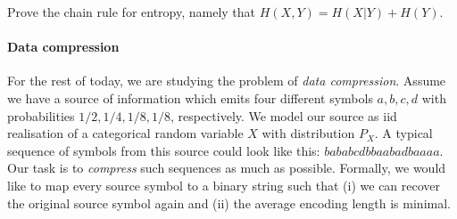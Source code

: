 \documentclass[10pt, a5paper]{scrartcl}
\begin{document}
\boardquestions


\begin{exercise}
	Prove the chain rule for entropy, namely that $H(X,Y)=H(X|Y)+H(Y)$.	
\end{exercise}


\paragraph{Data compression}
For the rest of today, we are studying the problem of \emph{data compression}. 
Assume we have a source of information which emits four different symbols $a,b,c,d$ with probabilities $1/2,1/4,1/8,1/8$, respectively. 
We model our source as iid realisation of a categorical random variable $X$ with distribution $P_X$.
A typical sequence of symbols from this source could look like this: $bababcdbbaabadbaaaa$.
Our task is to \emph{compress} such sequences as much as possible. 
Formally, we would like to map every source symbol to a binary string such that (i) we can recover the original source symbol again and (ii) the average encoding length is minimal.
\end{document}
